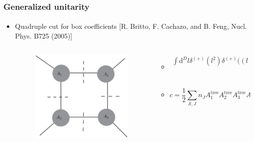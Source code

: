 \documentclass[english]{beamer}
\newcommand{\dd}{\textrm{d}}
\begin{document}
\begin{frame}[shrink=20]
\frametitle{Generalized unitarity}
\framesubtitle{}
\begin{itemize}
\item<1-> Quadruple cut for box coefficients
    \tiny\color{blue}
[R. Britto, F. Cachazo, and B. Feng, Nucl. Phys. B725 (2005)]
\color{black}\normalsize
\begin{columns}
\begin{column}{0.3\textwidth}
\begin{figure}[h]
  \centering
  \includegraphics[width=0.6\linewidth]{quadruple_cut.eps}
\end{figure}\end{column}
\begin{column}{0.7\textwidth}  %

\begin{itemize}

\item<2-> []
\small
\begin{equation*}
\begin{split}
\int\dd^D l \delta^{(+)}(l^2) \delta^{(+)}\big((l-K_1)^2\big)
& 
\delta^{(+)}\big((l-K_{12})^2\big)
\delta^{(+)}\big((l+K_4)^2\big)
A_1^{\mathrm{tree}}A_2^{\mathrm{tree}}A_3^{\mathrm{tree}}A_4^{\mathrm{tree}}
\\ & =
\int_{i\in\mathrm{box}} c_i \Delta I_i
\end{split}
\end{equation*} 
\normalsize

\item<3->[]
\begin{equation*}
c = \frac{1}{2}\sum_{\mathcal{S}, J}n_J A_1^{\mathrm{tree}}A_2^{\mathrm{tree}}A_3^{\mathrm{tree}}A_4^{\mathrm{tree}}
\end{equation*}



\end{itemize}
\end{column}
\end{columns}
\end{itemize}
\end{frame}
\end{document}
